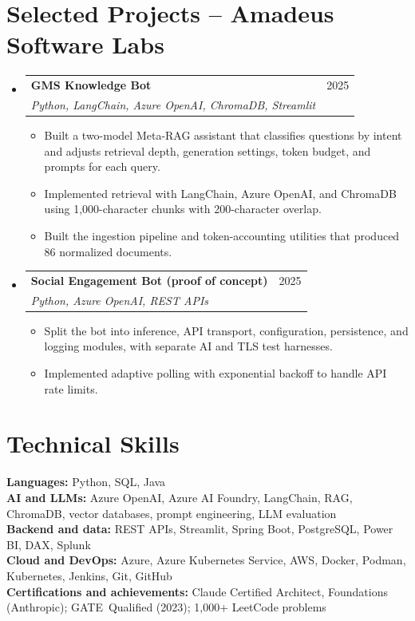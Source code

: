 \documentclass[a4paper,11pt]{article}
\makeatletter
\newcommand{\entry}[4]{\item\begin{tabularx}{\textwidth}{@{}Xr@{}}\textbf{#1}& #2\\\textit{\small #3}&\textit{\small #4}\end{tabularx}\vspace{-5pt}}
\newcommand{\bulletpoint}[1]{\item\small{#1}}
\makeatother
\begin{document}
\section{Selected Projects -- Amadeus Software Labs}
\begin{itemize}[leftmargin=0in,label={}]
  \entry{GMS Knowledge Bot}{2025}{Python, LangChain, Azure OpenAI, ChromaDB, Streamlit}{}
  \begin{itemize}
    \bulletpoint{Built a two-model Meta-RAG assistant that classif{}ies questions by intent and adjusts retrieval depth, generation settings, token budget, and prompts for each query.}
    \bulletpoint{Implemented retrieval with LangChain, Azure OpenAI, and ChromaDB using 1,000-character chunks with 200-character overlap.}
    \bulletpoint{Built the ingestion pipeline and token-accounting utilities that produced 86 normalized documents.}
  \end{itemize}
  \entry{Social Engagement Bot (proof of concept)}{2025}{Python, Azure OpenAI, REST APIs}{}
  \begin{itemize}
    \bulletpoint{Split the bot into inference, API transport, conf{}iguration, persistence, and logging modules, with separate AI and TLS test harnesses.}
    \bulletpoint{Implemented adaptive polling with exponential backof{}f to handle API rate limits.}
  \end{itemize}
\end{itemize}

\section{Technical Skills}
\small\textbf{Languages:} Python, SQL, Java \\
\textbf{AI and LLMs:} Azure OpenAI, Azure AI Foundry, LangChain, RAG, ChromaDB, vector databases, prompt engineering, LLM evaluation \\
\textbf{Backend and data:} REST APIs, Streamlit, Spring Boot, PostgreSQL, Power BI, DAX, Splunk \\
\textbf{Cloud and DevOps:} Azure, Azure Kubernetes Service, AWS, Docker, Podman, Kubernetes, Jenkins, Git, GitHub \\
\textbf{Certif{}ications and achievements:} Claude \mbox{Certif{}ied} Architect, Foundations (Anthropic); \mbox{GATE Qualif{}ied} (2023); 1,000+ LeetCode problems
\end{document}
